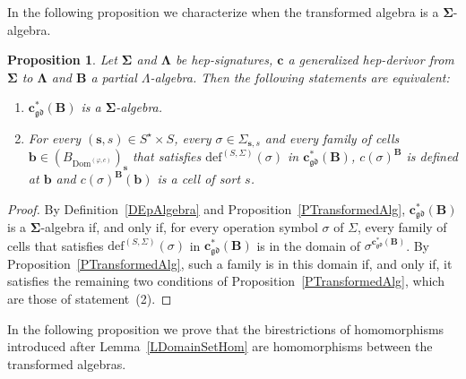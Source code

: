 \documentclass[a4paper, reqno
]{amsart}
\newcommand{\sig}[1]{\mathbf{#1}}             %
\newcommand{\Dom}{\mathrm{Dom}}
\newcommand{\gd}{\mathfrak{gd}}              %
\theoremstyle{plain}
\newtheorem{proposition}[theorem]{Proposition}
\theoremstyle{definition}
\begin{document}
In the following proposition we characterize when the transformed algebra is a $\sig{\Sigma}$-algebra.

\begin{proposition}\label{PTransformedEpAlg}
Let $\sig{\Sigma}$ and $\sig{\Lambda}$ be hep-signatures, $\mathbf{c}$ a generalized hep-derivor from $\sig{\Sigma}$ to $\sig{\Lambda}$ and $\mathbf{B}$ a partial $\Lambda$-algebra.
Then the following statements are equivalent:
\begin{enumerate}
\item $\mathbf{c}^{\ast}_{\gd}(\mathbf{B})$ is a $\sig{\Sigma}$-algebra.
\item For every $(\mathbf{s},s)\in S^{\star}\times S$, every $\sigma\in\Sigma_{\mathbf{s},s}$ and every family of cells $\mathbf{b}\in(B_{\Dom^{(\varphi,c)}})_{\mathbf{s}}$ that satisfies $\mathrm{def}^{(S,\Sigma)}(\sigma)$ in $\mathbf{c}^{\ast}_{\gd}(\mathbf{B})$, $c(\sigma)^{\mathbf{B}}$ is defined at $\mathbf{b}$ and $c(\sigma)^{\mathbf{B}}(\mathbf{b})$ is a cell of sort $s$.
\end{enumerate}
\end{proposition}
\begin{proof}
By Definition~\ref{DEpAlgebra} and Proposition~\ref{PTransformedAlg}, $\mathbf{c}^{\ast}_{\gd}(\mathbf{B})$ is a $\sig{\Sigma}$-algebra if, and only if, for every operation symbol $\sigma$ of $\Sigma$, every family of cells that satisfies $\mathrm{def}^{(S,\Sigma)}(\sigma)$ in $\mathbf{c}^{\ast}_{\gd}(\mathbf{B})$ is in the domain of $\sigma^{\mathbf{c}^{\ast}_{\gd}(\mathbf{B})}$.
By Proposition~\ref{PTransformedAlg}, such a family is in this domain if, and only if, it satisfies the remaining two conditions of Proposition~\ref{PTransformedAlg}, which are those of statement~(2).
\end{proof}

In the following proposition we prove that the birestrictions of homomorphisms introduced after Lemma~\ref{LDomainSetHom} are homomorphisms between the transformed algebras.
\end{document}
